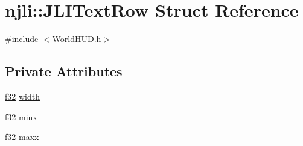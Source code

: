 \hypertarget{structnjli_1_1_j_l_i_text_row}{}\section{njli\+:\+:J\+L\+I\+Text\+Row Struct Reference}
\label{structnjli_1_1_j_l_i_text_row}


{\ttfamily \#include $<$World\+H\+U\+D.\+h$>$}

\subsection*{Private Attributes}
\begin{DoxyCompactItemize}
\item 
\mbox{\hyperlink{_util_8h_a5f6906312a689f27d70e9d086649d3fd}{f32}} \mbox{\hyperlink{structnjli_1_1_j_l_i_text_row_a94b1a25f325ac2fd07b319026148c610}{width}}
\item 
\mbox{\hyperlink{_util_8h_a5f6906312a689f27d70e9d086649d3fd}{f32}} \mbox{\hyperlink{structnjli_1_1_j_l_i_text_row_ae14ecb70a2695a2d483416491b5c3f7c}{minx}}
\item 
\mbox{\hyperlink{_util_8h_a5f6906312a689f27d70e9d086649d3fd}{f32}} \mbox{\hyperlink{structnjli_1_1_j_l_i_text_row_a4721c180f0c8e5d637900c37e9bdb1d5}{maxx}}
\end{DoxyCompactItemize}
